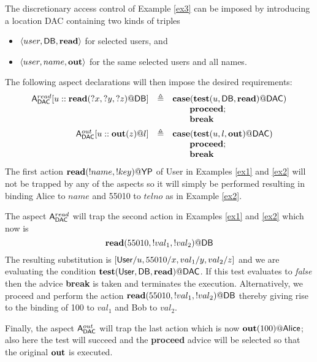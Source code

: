 \documentclass[a4paper]{llncs}
\begin{document}
\begin{example}\label{ex4}
The discretionary access control of Example \ref{ex3} can be imposed by introducing a
location {\sf DAC} containing two kinds of triples
\begin{itemize}
\item $\langle user,{{\sf DB}},{\bf read}\rangle$ for selected users, and
\item $\langle user,name,{\bf out}\rangle$ for the same selected users and all names.
\end{itemize}
The following aspect declarations will then impose the desired requirements:
$$
\begin{array}{rcl}\small
{\sf A}_{\sf DAC}^{read}[u::{\bf read}(?x,?y,?z)@{{\sf DB}}] 
& \triangleq & {\bf case}({\bf test}(u,{{\sf DB}},{\bf read})@{\sf DAC})\\ 
&& \qquad {\bf proceed};\\
&& \qquad {\bf break} \\[1ex]
{\sf A}_{\sf DAC}^{out}[u::{\bf out}(z)@l] 
& \triangleq &  {\bf case}({\bf test}(u,l,{\bf out})@{\sf DAC})\\ 
&& \qquad {\bf proceed};\\ && \qquad {\bf break} 
\end{array}
$$
The first action ${\bf read}(!name,!key)@{{\sf YP}}$ of {\sf User} 
in Examples \ref{ex1} and \ref{ex2} will not be trapped
by any of the aspects so it will simply be performed resulting in binding {\sf Alice} to 
$name$ and 55010 to $telno$ as in Example \ref{ex2}. 

The aspect ${\sf A}_{\sf DAC}^{read}$ will trap the second action 
in Examples \ref{ex1} and \ref{ex2} which now is 
\[
{\bf read}(55010,!val_1,!val_2)@{{\sf DB}}
\]
The resulting substitution is 
$[{\sf User}/u,55010/x,val_1/y,val_2/z]$ and we are evaluating the condition
${\bf test}({\sf User},{{\sf DB}},{\bf read})@{\sf DAC}$. If this test evaluates
to \emph{false} then the advice {\bf break} is taken and terminates the execution. 
Alternatively, we proceed and perform the action ${\bf read}(55010,!val_1,!val_2)@{{\sf DB}}$
thereby giving rise to the binding of 100 to $val_1$ and {\sf Bob} to $val_2$.

Finally, the aspect ${\sf A}_{\sf DAC}^{out}$ will trap the last action which is now
${\bf out}(100)@{\sf Alice}$; also here the test will succeed and the {\bf proceed}
advice will be selected so that the original ${\bf out}$ is executed.


\end{example}
\end{document}
